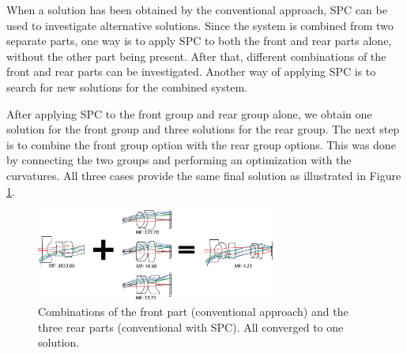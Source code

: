 When a solution has been obtained by the conventional approach, SPC can be used to investigate alternative solutions. Since the system is combined from two separate parts, one way is to apply SPC to both the front and rear parts alone, without the other part being present. After that, different combinations of the front and rear parts can be investigated. Another way of applying SPC is to search for new solutions for the combined system.

After applying SPC to the front group and rear group alone, we obtain one solution for the front group and three solutions for the rear group. The next step is to combine the front group option with the rear group options. This was done by connecting the two groups and performing an optimization with the curvatures. All three cases provide the same final solution as illustrated in Figure \ref{fig:WAL_combine}.

\begin{figure}[h!]
    \centering
    \includegraphics[width=0.7\textwidth]{chapter-4/figures/WAL_combine.png}
    \caption{Combinations of the front part (conventional approach) and the three rear parts (conventional with SPC). All converged to one solution. }
    \label{fig:WAL_combine}
\end{figure}

